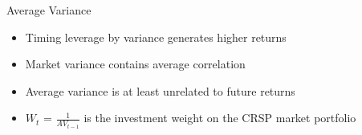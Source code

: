 \documentclass{beamer}
\begin{document}
\begin{frame}{Average Variance}
	\begin{itemize}[<+->]
		\item Timing leverage by variance generates higher returns
		\item Market variance contains average correlation
		\item Average variance is at least unrelated to future returns
		\item $W_{t}$ = $\frac{1}{AV_{t-1}}$ is the investment weight on the CRSP market portfolio
	\end{itemize}
\end{frame}

%
%
\end{document}

